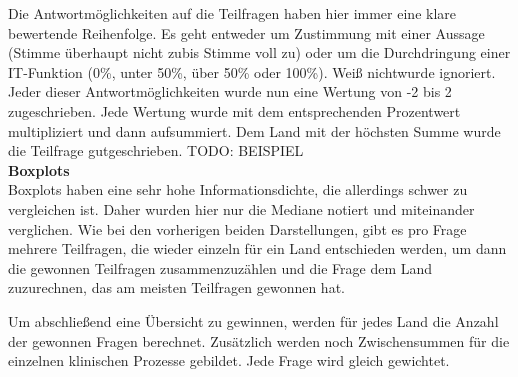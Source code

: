	Die Antwortmöglichkeiten auf die Teilfragen haben hier immer eine klare bewertende Reihenfolge. Es geht entweder um Zustimmung mit einer Aussage (\glqq Stimme überhaupt nicht zu\grqq{ }bis \glqq Stimme voll zu\grqq) oder um die Durchdringung einer IT-Funktion (0\%, unter 50\%, über 50\% oder 100\%). \glqq Weiß nicht\grqq{ }wurde ignoriert. Jeder dieser Antwortmöglichkeiten wurde nun eine Wertung von -2 bis 2 zugeschrieben. Jede Wertung wurde mit dem entsprechenden Prozentwert multipliziert und dann aufsummiert. Dem Land mit der höchsten Summe wurde die Teilfrage gutgeschrieben.
	TODO: BEISPIEL
	\vspace{\parheadvspace}\\
	\textbf{Boxplots}\\
	Boxplots haben eine sehr hohe Informationsdichte, die allerdings schwer zu vergleichen ist. Daher wurden hier nur die Mediane notiert und miteinander verglichen. Wie bei den vorherigen beiden Darstellungen, gibt es pro Frage mehrere Teilfragen, die wieder einzeln für ein Land entschieden werden, um dann die gewonnen Teilfragen zusammenzuzählen und die Frage dem Land zuzurechnen, das am meisten Teilfragen gewonnen hat.

	Um abschließend eine Übersicht zu gewinnen, werden für jedes Land die Anzahl der gewonnen Fragen berechnet. Zusätzlich werden noch Zwischensummen für die einzelnen klinischen Prozesse gebildet. Jede Frage wird gleich gewichtet. 

